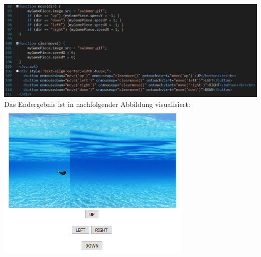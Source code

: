 \newline
\includegraphics[width=1\textwidth]{img/vincent/abb08.png}
\newline
Das Endergebnis ist in nachfolgender Abbildung visualisiert:
\newline
\includegraphics[width=0.7\textwidth]{img/vincent/abb09.png}
\newline

